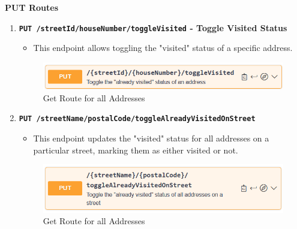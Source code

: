     \textbf{PUT Routes}

    \begin{enumerate}    
        \item \textbf{\texttt{PUT /{streetId}/{houseNumber}/toggleVisited} - Toggle Visited Status}
        \begin{itemize}
            \item This endpoint allows toggling the "visited" status of a specific address.
        \end{itemize} 
        \begin{figure} [H]
            \centering
            \includegraphics [width=1\textwidth] {images/andreas/praxis/toggleAlreadyVisitedOfAddress.png}
            \caption{Get Route for all Addresses}
        \end{figure}

        \item \textbf{\texttt{PUT /{streetName}/{postalCode}/toggleAlreadyVisitedOnStreet}}
        \begin{itemize}
            \item This endpoint updates the "visited" status for all addresses on a particular street, marking them as either visited or not.
        \end{itemize} 
        \begin{figure} [H]
            \centering
            \includegraphics [width=1\textwidth] {images/andreas/praxis/toggleAlreadyVisitedOfAddressesOnStreet.png}
            \caption{Get Route for all Addresses}
        \end{figure}

        
    \end{enumerate}

